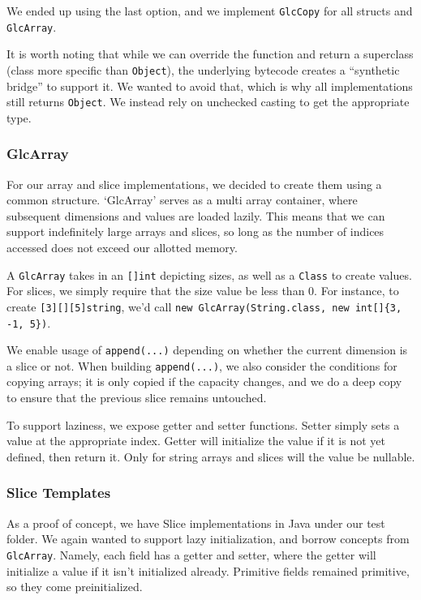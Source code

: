\documentclass[11pt]{article}
\begin{document}
We ended up using the last option, and we implement \texttt{GlcCopy} for all structs and \texttt{GlcArray}.

It is worth noting that while we can override the function and return a superclass (class more specific than \texttt{Object}), 
the underlying bytecode creates a ``synthetic bridge'' to support it.
We wanted to avoid that, which is why all implementations still returns 
\texttt{Object}. We instead rely on unchecked casting to get the appropriate type.

\subsubsection{GlcArray}

For our array and slice implementations, we decided to create them using a common structure.
`GlcArray' serves as a multi array container, where subsequent dimensions and values are loaded lazily.
This means that we can support indefinitely large arrays and slices, so long as the number of indices accessed does not exceed our allotted memory.

A \texttt{GlcArray} takes in an \texttt{[]int} depicting sizes, as well as a \texttt{Class} to create values.
For slices, we simply require that the size value be less than 0.
For instance, to create \texttt{[3][][5]string}, we'd call \texttt{new GlcArray(String.class, new int[]\{3, -1, 5\})}.

We enable usage of \texttt{append(...)} depending on whether the current dimension is a slice or not.
When building \texttt{append(...)}, we also consider the conditions for copying arrays; it is only copied if the capacity changes, and we do a deep copy to ensure that the previous slice remains untouched.

To support laziness, we expose getter and setter functions.
Setter simply sets a value at the appropriate index.
Getter will initialize the value if it is not yet defined, then return it.
Only for string arrays and slices will the value be nullable.

\subsubsection{Slice Templates}

As a proof of concept, we have Slice implementations in Java under our test folder.
We again wanted to support lazy initialization, and borrow concepts from \texttt{GlcArray}.
Namely, each field has a getter and setter, where the getter will initialize a value if it isn't initialized already.
Primitive fields remained primitive, so they come preinitialized.
\end{document}
